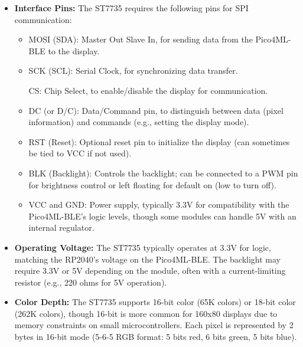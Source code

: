 \begin{itemize}

	\item \textbf{Interface Pins:} The ST7735 requires the following pins for SPI communication:

	\begin{itemize}

		\item MOSI (SDA): Master Out Slave In, for sending data from the Pico4ML-BLE to the display.

		\item SCK (SCL): Serial Clock, for synchronizing data transfer.

		\subitem CS: Chip Select, to enable/disable the display for communication.

		\item DC (or D/C): Data/Command pin, to distinguish between data (pixel information) and commands (e.g., setting the display mode).

		\item RST (Reset): Optional reset pin to initialize the display (can sometimes be tied to VCC if not used).

		\item BLK (Backlight): Controls the backlight; can be connected to a PWM pin for brightness control or left floating for default on (low to turn off).

		\item VCC and GND: Power supply, typically 3.3V for compatibility with the Pico4ML-BLE’s logic levels, though some modules can handle 5V with an internal regulator.\cite{Sitronix:2010}

	\end{itemize}



	

	\item \textbf{Operating Voltage:} The ST7735 typically operates at 3.3V for logic, matching the RP2040’s voltage on the Pico4ML-BLE. The backlight may require 3.3V or 5V depending on the module, often with a current-limiting resistor (e.g., 220 ohms for 5V operation).

	\item \textbf{Color Depth:} The ST7735 supports 16-bit color (65K colors) or 18-bit color (262K colors), though 16-bit is more common for 160x80 displays due to memory constraints on small microcontrollers. Each pixel is represented by 2 bytes in 16-bit mode (5-6-5 RGB format: 5 bits red, 6 bits green, 5 bits blue).\cite{Sitronix:2010}


\end{itemize}
